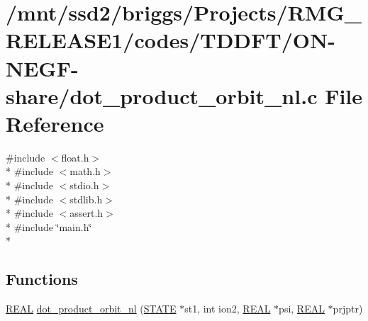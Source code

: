 \hypertarget{_t_d_d_f_t_2_o_n-_n_e_g_f-share_2dot__product__orbit__nl_8c}{\section{/mnt/ssd2/briggs/\-Projects/\-R\-M\-G\-\_\-\-R\-E\-L\-E\-A\-S\-E1/codes/\-T\-D\-D\-F\-T/\-O\-N-\/\-N\-E\-G\-F-\/share/dot\-\_\-product\-\_\-orbit\-\_\-nl.c File Reference}
\label{_t_d_d_f_t_2_o_n-_n_e_g_f-share_2dot__product__orbit__nl_8c}
}
{\ttfamily \#include $<$float.\-h$>$}\\*
{\ttfamily \#include $<$math.\-h$>$}\\*
{\ttfamily \#include $<$stdio.\-h$>$}\\*
{\ttfamily \#include $<$stdlib.\-h$>$}\\*
{\ttfamily \#include $<$assert.\-h$>$}\\*
{\ttfamily \#include \char`\"{}main.\-h\char`\"{}}\\*
\subsection*{Functions}
\begin{DoxyCompactItemize}
\item 
\hyperlink{md_8h_a4b654506f18b8bfd61ad2a29a7e38c25}{R\-E\-A\-L} \hyperlink{_t_d_d_f_t_2_o_n-_n_e_g_f-share_2dot__product__orbit__nl_8c_ac76a442b75c2f9e7ff39c9b0748cef93}{dot\-\_\-product\-\_\-orbit\-\_\-nl} (\hyperlink{struct_s_t_a_t_e}{S\-T\-A\-T\-E} $\ast$st1, int ion2, \hyperlink{md_8h_a4b654506f18b8bfd61ad2a29a7e38c25}{R\-E\-A\-L} $\ast$psi, \hyperlink{md_8h_a4b654506f18b8bfd61ad2a29a7e38c25}{R\-E\-A\-L} $\ast$prjptr)
\end{DoxyCompactItemize}


